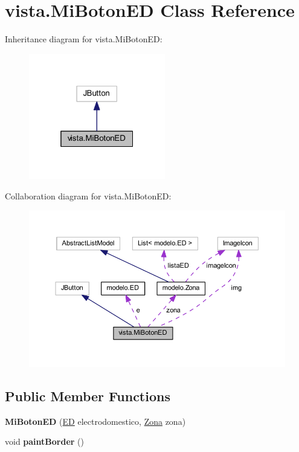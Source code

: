 \hypertarget{classvista_1_1_mi_boton_e_d}{}\section{vista.\+Mi\+Boton\+ED Class Reference}
\label{classvista_1_1_mi_boton_e_d}


Inheritance diagram for vista.\+Mi\+Boton\+ED\+:
\nopagebreak
\begin{figure}[H]
\begin{center}
\leavevmode
\includegraphics[width=169pt]{classvista_1_1_mi_boton_e_d__inherit__graph}
\end{center}
\end{figure}


Collaboration diagram for vista.\+Mi\+Boton\+ED\+:
\nopagebreak
\begin{figure}[H]
\begin{center}
\leavevmode
\includegraphics[width=350pt]{classvista_1_1_mi_boton_e_d__coll__graph}
\end{center}
\end{figure}
\subsection*{Public Member Functions}
\begin{DoxyCompactItemize}
\item 
\mbox{\label{classvista_1_1_mi_boton_e_d_a6bf8b2b884c0f583021de69e0a7eea73}} 
{\bfseries Mi\+Boton\+ED} (\mbox{\hyperlink{classmodelo_1_1_e_d}{ED}} electrodomestico, \mbox{\hyperlink{classmodelo_1_1_zona}{Zona}} zona)
\item 
\mbox{\label{classvista_1_1_mi_boton_e_d_a84868d3ea73732ef8fa4385a73e3b3b9}} 
void {\bfseries paint\+Border} ()
\end{DoxyCompactItemize}


